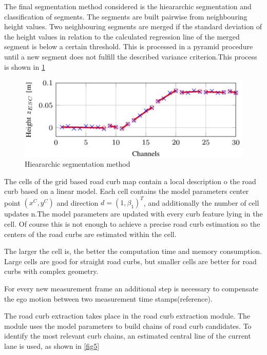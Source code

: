 \documentclass[conference]{IEEEtran}
\begin{document}
The final segmentation method considered is the hieararchic segmentation and classification of segments. The segments are built pairwise from neighbouring height values. Two neighbouring segments are merged if the standard deviation of the height values in relation to the calculated regression line of the merged segment is below a certain threshold. This is processed in a pyramid procedure until a new segment does not fulfill the described variance criterion.This process is shown in \ref{fig4}

\begin{figure}[H]
	\centering
 	\includegraphics[scale = 0.55]{pictures/iepf3.pdf}
	\caption{Hieararchic segmentation method  \cite{lidar13}}
	\label{fig4}
\end{figure}

The cells of the grid based road curb map contain a local description o the road curb based on a linear model. Each cell contains the model parameters center point $(x^C, y^C)$ and direction $d = (1, \beta_1)^T$, and additionally the number of cell updates n.The model parameters are updated with every curb feature lying in the cell. Of course this is not enough to achieve a precise road curb estimation so the centers of the road curbs are estimated within the cell.

The larger the cell is, the better the computation time and memory consumption. Large cells are good for straight road curbs, but smaller cells are better for road curbs with complex geometry.

For every new measurement frame an additional step is necessary to compensate the ego motion between two measurement time stamps(reference). 

The road curb extraction takes place in the road curb extraction module. The module uses the model parameters to build chains of road curb candidates. To identify the most relevant curb chains, an estimated central line of the current lane is used, as shown in \ref{fig5}
\end{document}
